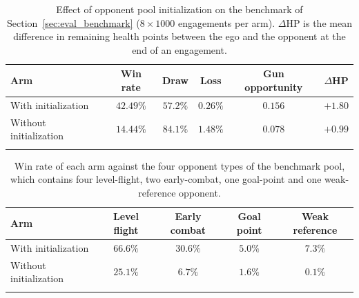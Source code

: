 
\begin{table}[h]
\caption{Effect of opponent pool initialization on the benchmark of Section~\ref{sec:eval_benchmark} ($8\times1000$ engagements per arm). $\Delta$HP is the mean difference in remaining health points between the ego and the opponent at the end of an engagement.}
\label{tab:init_ablation_results}
\small
\begin{tabular*}{\textwidth}{@{\extracolsep\fill}lccccc}
\toprule
Arm & Win rate & Draw & Loss & Gun opportunity & $\Delta$HP\\
\midrule
With initialization & $42.49\%$ & $57.2\%$ & $0.26\%$ & $0.156$ & $+1.80$\\
Without initialization & $14.44\%$ & $84.1\%$ & $1.48\%$ & $0.078$ & $+0.99$\\
\botrule
\end{tabular*}
\end{table}

\begin{table}[h]
\caption{Win rate of each arm against the four opponent types of the benchmark pool, which contains four level-flight, two early-combat, one goal-point and one weak-reference opponent.}
\label{tab:init_ablation_bytype}
\small
\begin{tabular*}{\textwidth}{@{\extracolsep\fill}lcccc}
\toprule
Arm & Level flight & Early combat & Goal point & Weak reference\\
\midrule
With initialization & $66.6\%$ & $30.6\%$ & $5.0\%$ & $7.3\%$\\
Without initialization & $25.1\%$ & $6.7\%$ & $1.6\%$ & $0.1\%$\\
\botrule
\end{tabular*}
\end{table}
